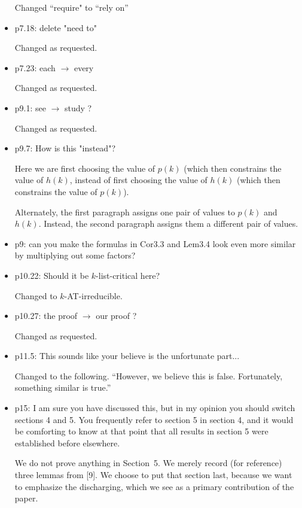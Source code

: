 \documentclass{article}
\begin{document}
\begin{itemize}
Changed ``require" to ``rely on''
\item p7.18: delete "need to"

Changed as requested.
\item p7.23: each $\to$ every

Changed as requested.
\item p9.1: see $\to$ study ?

Changed as requested.
\item p9.7: How is this "instead"? 

Here we are first choosing the value of $p(k)$ (which then constrains the value
of $h(k)$, instead of first choosing the value of $h(k)$ (which then constrains
the value of $p(k)$).

Alternately, the first paragraph assigns one pair of values to $p(k)$ and
$h(k)$.  Instead, the second paragraph assigns them a different pair of values.

\item p9: can you make the formulas in Cor3.3 and Lem3.4 look even more similar by multiplying out some factors?

\item p10.22: Should it be $k$-list-critical here?

Changed to $k$-AT-irreducible.

\item p10.27: the proof $\to$ our proof ?

Changed as requested.
\item p11.5: This sounds like your believe is the unfortunate part...

Changed to the following.
``However, we believe this is false. Fortunately, something similar is true.''

\item p15: I am sure you have discussed this, but in my opinion you should switch sections 4 and 5. You frequently refer to section 5 in section 4, and it would be comforting to know at that point that all results in section 5 were established before elsewhere.

We do not prove anything in Section~5.  We merely record (for reference) three
lemmas from [9].  We choose to put that section last, because we want to
emphasize the discharging, which we see as a primary contribution of the paper.
\end{itemize}
\end{document}
